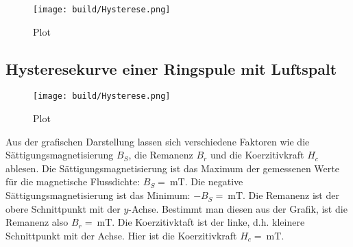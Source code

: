 

\begin{figure}
    \centering
    \texttt{[image: build/Hysterese.png]} %
    \caption{Plot}
\end{figure}


\subsection{Hysteresekurve einer Ringspule mit Luftspalt}

\begin{figure}
    \centering
    \texttt{[image: build/Hysterese.png]} %
    \caption{Plot}
\end{figure}

Aus der grafischen Darstellung lassen sich verschiedene Faktoren
wie die Sättigungsmagnetisierung $B_{S}$, die Remanenz $B_{r}$ und die
Koerzitivkraft $H_{c}$ ablesen.
Die Sättigungsmagnetisierung ist das Maximum der gemessenen Werte für
die magnetische Flussdichte: $B_{S} = \SI{}{\milli\tesla}$. %
Die negative Sättigungsmagnetisierung ist das Minimum:
$-B_{S} = \SI{}{\milli\tesla}$. %
Die Remanenz ist der obere Schnittpunkt mit der $y$-Achse.
Bestimmt man diesen aus der Grafik, ist die Remanenz also
$B_{r} = \SI{}{\milli\tesla}$. %
Die Koerzitivktaft ist der linke, d.h. kleinere Schnittpunkt mit der Achse.
Hier ist die Koerzitivkraft $H_{c} = \SI{}{\milli\tesla}$. %